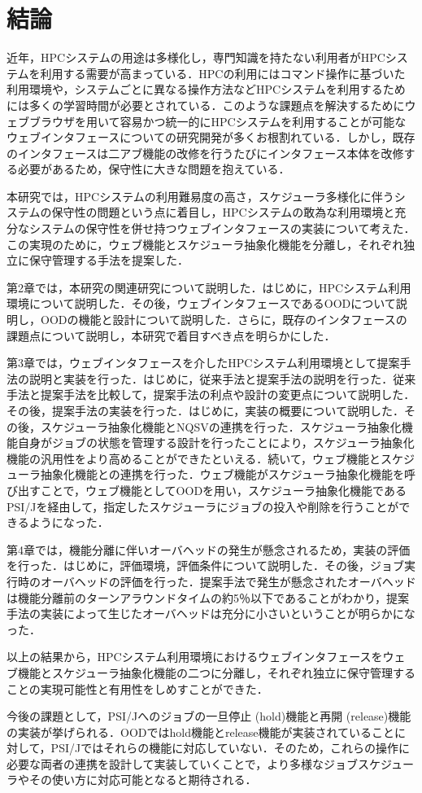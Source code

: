 \section{結論}
近年，HPCシステムの用途は多様化し，専門知識を持たない利用者がHPCシステムを利用する需要が高まっている．HPCの利用にはコマンド操作に基づいた利用環境や，システムごとに異なる操作方法などHPCシステムを利用するためには多くの学習時間が必要とされている．このような課題点を解決するためにウェブブラウザを用いて容易かつ統一的にHPCシステムを利用することが可能なウェブインタフェースについての研究開発が多くお根割れている．しかし，既存のインタフェースは二アブ機能の改修を行うたびにインタフェース本体を改修する必要があるため，保守性に大きな問題を抱えている．\par
本研究では，HPCシステムの利用難易度の高さ，スケジューラ多様化に伴うシステムの保守性の問題という点に着目し，HPCシステムの敢為な利用環境と充分なシステムの保守性を併せ持つウェブインタフェースの実装について考えた．この実現のために，ウェブ機能とスケジューラ抽象化機能を分離し，それぞれ独立に保守管理する手法を提案した．\par
第2章では，本研究の関連研究について説明した．はじめに，HPCシステム利用環境について説明した．その後，ウェブインタフェースであるOODについて説明し，OODの機能と設計について説明した．さらに，既存のインタフェースの課題点について説明し，本研究で着目すべき点を明らかにした．\par
第3章では，ウェブインタフェースを介したHPCシステム利用環境として提案手法の説明と実装を行った．はじめに，従来手法と提案手法の説明を行った．従来手法と提案手法を比較して，提案手法の利点や設計の変更点について説明した．その後，提案手法の実装を行った．はじめに，実装の概要について説明した．その後，スケジューラ抽象化機能とNQSVの連携を行った．スケジューラ抽象化機能自身がジョブの状態を管理する設計を行ったことにより，スケジューラ抽象化機能の汎用性をより高めることができたといえる．続いて，ウェブ機能とスケジューラ抽象化機能との連携を行った．ウェブ機能がスケジューラ抽象化機能を呼び出すことで，ウェブ機能としてOODを用い，スケジューラ抽象化機能であるPSI/Jを経由して，指定したスケジューラにジョブの投入や削除を行うことができるようになった．\par
第4章では，機能分離に伴いオーバヘッドの発生が懸念されるため，実装の評価を行った．はじめに，評価環境，評価条件について説明した．その後，ジョブ実行時のオーバヘッドの評価を行った．提案手法で発生が懸念されたオーバヘッドは機能分離前のターンアラウンドタイムの約5％以下であることがわかり，提案手法の実装によって生じたオーバヘッドは充分に小さいということが明らかになった．\par
以上の結果から，HPCシステム利用環境におけるウェブインタフェースをウェブ機能とスケジューラ抽象化機能の二つに分離し，それぞれ独立に保守管理することの実現可能性と有用性をしめすことができた．\par
今後の課題として，PSI/Jへのジョブの一旦停止 (hold)機能と再開 (release)機能の実装が挙げられる．OODではhold機能とrelease機能が実装されていることに対して，PSI/Jではそれらの機能に対応していない．そのため，これらの操作に必要な両者の連携を設計して実装していくことで，より多様なジョブスケジューラやその使い方に対応可能となると期待される．

